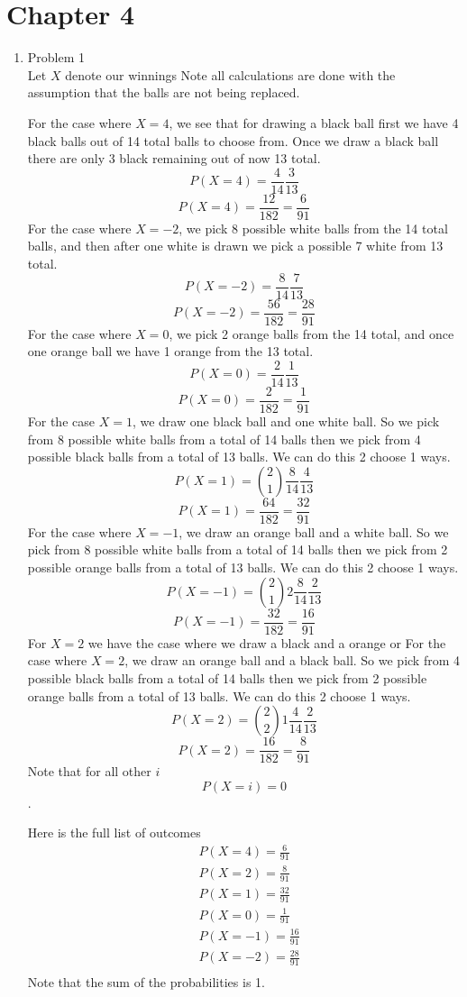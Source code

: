 \documentclass[11pt]{article}
\begin{document}

\section{Chapter 4}
\begin{enumerate}
\item Problem 1\\
Let $X$ denote our winnings
Note all calculations are done with the assumption that the balls are not being replaced.

For the case where $X=4$, we see that for drawing a black ball first we have 4 black balls out of 14 total balls to choose from. Once we draw a black ball there are only 3 black remaining out of now 13 total.
$$P(X=4) = \frac{4}{14}\frac{3}{13}$$ 
$$P(X=4) = \frac{12}{182} = \frac{6}{91}$$
For the case where $X=-2$, we pick 8 possible white balls from the 14 total balls, and then after one white is drawn we pick a possible 7 white from 13 total.
$$P(X=-2) = \frac{8}{14}\frac{7}{13}$$ 
$$P(X=-2) = \frac{56}{182} = \frac{28}{91}$$
For the case where $X=0$, we pick 2 orange balls from the 14 total, and once one orange ball we have 1 orange from the 13 total.
$$P(X=0) = \frac{2}{14}\frac{1}{13}$$ 
$$P(X=0) =\frac{2}{182} =  \frac{1}{91}$$
For the case $X=1$, we draw one black ball and one white ball. So we pick from 8 possible white balls from a total of 14 balls then we pick from 4 possible black balls from a total of 13 balls. We can do this 2 choose 1 ways. 
$$P(X=1) = {2\choose1}\frac{8}{14}\frac{4}{13}$$ 
$$P(X=1) =\frac{64}{182} =  \frac{32}{91}$$
For the case where $X=-1$, we draw an orange ball and a white ball. So we pick from 8 possible white balls from a total of 14 balls then we pick from 2 possible orange balls from a total of 13 balls. We can do this 2 choose 1 ways. 
$$P(X=-1) = {2\choose1}2\frac{8}{14}\frac{2}{13}$$ 
$$P(X=-1) = \frac{32}{182} = \frac{16}{91}$$
For $X=2$ we have the case where we draw a black and a orange or
For the case where $X=2$, we draw an orange ball and a black ball. So we pick from 4 possible black balls from a total of 14 balls then we pick from 2 possible orange balls from a total of 13 balls. We can do this 2 choose 1 ways. 
$$P(X=2) = {2\choose2}1\frac{4}{14}\frac{2}{13}$$ 
$$P(X=2) = \frac{16}{182} = \frac{8}{91}$$
Note that for all other $i$ 
$$P(X=i)=0$$.

Here is the full list of outcomes
\begin{align*}
&P(X=4) = \frac{6}{91}\\
&P(X=2) = \frac{8}{91}\\
&P(X=1) = \frac{32}{91}\\
&P(X=0) = \frac{1}{91}\\
&P(X=-1) = \frac{16}{91}\\
&P(X=-2) = \frac{28}{91}\\
\end{align*}
Note that the sum of the probabilities is 1.


\end{enumerate}
\end{document}
